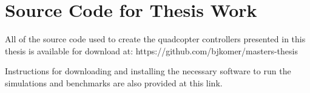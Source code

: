 \documentclass[letterpaper,12pt,titlepage,oneside,final]{book}
\let\origdoublepage\cleardoublepage
\newcommand{\clearemptydoublepage}{%
  \clearpage{\pagestyle{empty}\origdoublepage}}
\let\cleardoublepage\clearemptydoublepage
\begin{document}
\chapter[Link to the Source Code]{Source Code for Thesis Work}
\label{AppendixA}

All of the source code used to create the quadcopter controllers presented in this thesis is available for download at: https://github.com/bjkomer/masters-thesis

Instructions for downloading and installing the necessary software to run the simulations and benchmarks are also provided at this link.




\cleardoublepage %
\renewcommand*{\bibname}{References}




\nocite{*}
\end{document}
